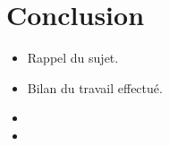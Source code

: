 \chapter*{Conclusion}
  \begin{itemize}
    \item Rappel du sujet.
    \item Bilan du travail effectué.
    \item
    \item
  \end{itemize}

